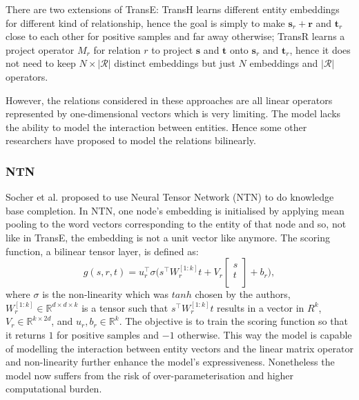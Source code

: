 \documentclass[12pt]{report}
\begin{document}
There are two extensions of TransE: TransH \cite{wang_knowledge_2014} learns different entity embeddings for different kind of relationship, hence the goal is simply to make $\mathbf{s}_r+\mathbf{r}$ and $\mathbf{t}_r$ close to each other for positive samples and far away otherwise; TransR \cite{lin_learning_2015} learns a project operator $M_r$ for relation $r$ to project $\mathbf{s}$ and $\mathbf{t}$ onto $\mathbf{s}_r$ and $\mathbf{t}_r$, hence it does not need to keep $N\times|\mathcal{R}|$ distinct embeddings but just $N$ embeddings and $|\mathcal{R}|$ operators.

However, the relations considered in these approaches are all linear operators represented by one-dimensional vectors which is very limiting. The model lacks the ability to model the interaction between entities. Hence some other researchers have proposed to model the relations bilinearly.

\subsubsection{NTN}
Socher et al. \cite{socher_reasoning_2013} proposed to use Neural Tensor Network (NTN) to do knowledge base completion. In NTN, one node's embedding is initialised by applying mean pooling to the word vectors corresponding to the entity of that node and so, not like in TransE, the embedding is not a unit vector like anymore.
The scoring function, a bilinear tensor layer, is defined as:
\[g(s, r, t)=u_r^\top\sigma\bigg(s^\top W_r^{[1:k]}t+V_r\begin{bmatrix}s \\
t \\
\end{bmatrix}+b_{r} \bigg), \]
where $\sigma$ is the non-linearity which was $tanh$ chosen by the authors, $W_r^{[1:k]}\in\mathbb{R}^{d\times d\times k}$ is a tensor such that $s^\top W_r^{[1:k]}t$ results in a vector in $R^k$, $V_r\in \mathbb{R}^{k\times 2d}$, and $u_r, b_r \in \mathbb{R}^k$. The objective is to train the scoring function so that it returns $1$ for positive samples and $-1$ otherwise. This way the model is capable of modelling the interaction between entity vectors and the linear matrix operator and non-linearity further enhance the model's expressiveness. Nonetheless the model now suffers from the risk of over-parameterisation and higher computational burden.
\end{document}
